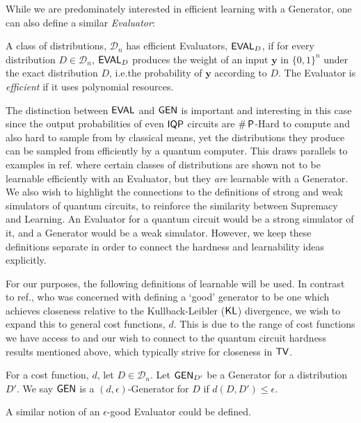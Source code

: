 While we are predominately interested in efficient learning with a Generator, one can also define a similar \textit{Evaluator}:
\begin{definition}\label{defn:evaluator_supp}
     A class of distributions, $\mathcal{D}_n$ has efficient Evaluators, $\operatorname{\textsf{EVAL}}_{D}$, if for every distribution $D \in \mathcal{D}_n$, $\operatorname{\textsf{EVAL}}_{D}$ produces the weight of an input $\mathbf{y}$ in $\{0, 1\}^n$ under the exact distribution $D$, i.e.\@ the probability of $\mathbf{y}$ according to $D$. The Evaluator is \emph{efficient} if it uses polynomial resources.
\end{definition}

The distinction between $\operatorname{\textsf{EVAL}}$ and $\operatorname{\textsf{GEN}}$ is important and interesting in this case since the output probabilities of even $\operatorname{\textsf{IQP}}$ circuits are $\#\operatorname{\textsf{P}}$-Hard to compute and also hard to sample from by classical means, yet the distributions they produce can be sampled from efficiently by a quantum computer. This draws parallels to examples in ref. where certain classes of distributions are shown not to be learnable efficiently with an Evaluator, but they \textit{are} learnable with a Generator. We also wish to highlight the connections to the definitions of strong and weak simulators of quantum circuits,  to reinforce the similarity between Supremacy and Learning. An Evaluator for a quantum circuit would be a strong simulator of it, and a Generator would be a weak simulator. However, we keep these definitions separate in order to connect the hardness and learnability ideas explicitly.

For our purposes, the following definitions of learnable will be used. In contrast to ref., who was concerned with defining a `good' generator to be one which achieves closeness relative to the Kullback-Leibler ($\operatorname{\textsf{KL}}$) divergence, we wish to expand this to general cost functions, $d$. This is due to the range of cost functions we have access to and our wish to connect to the quantum circuit hardness results mentioned above, which typically strive for closeness in $\operatorname{\textsf{TV}}$. %
\begin{definition}
    For a cost function, $d$, let $D \in \mathcal{D}_n$. Let $\operatorname{\textsf{GEN}}_{D'}$ be a Generator for a distribution $D'$. We say $\operatorname{\textsf{GEN}}$ is a $\left( d , \epsilon \right)$-Generator for $D$ if $d(D, D') \leq \epsilon$.
\end{definition}
A similar notion of an $\epsilon$-good Evaluator could be defined.

